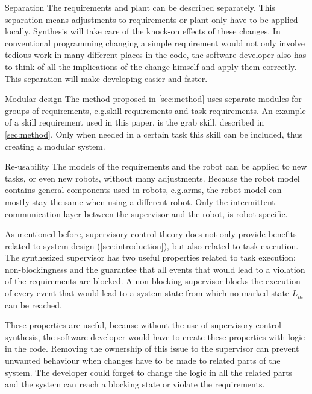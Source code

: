 \begin{LaTeXdescription}
\item[Separation] The requirements and plant can be described separately. This separation means adjustments to requirements or plant only have to be applied locally. Synthesis will take care of the knock-on effects of these changes. In conventional programming changing a simple requirement would not only involve tedious work in many different places in the code, the software developer also has to think of all the implications of the change himself and apply them correctly. This separation will make developing easier and faster.\\
\item[Modular design] The method proposed in \cref{sec:method} uses separate modules for groups of requirements, e.g.\@ skill requirements and task requirements. An example of a skill requirement used in this paper, is the grab skill, described in \cref{sec:method}. Only when needed in a certain task this skill can be included, thus creating a modular system.\\
\item[Re-usability] The models of the requirements and the robot can be applied to new tasks, or even new robots, without many adjustments. Because the robot model contains general components used in robots, e.g.\@ arms, the robot model can mostly stay the same when using a different robot. Only the intermittent communication layer between the supervisor and the robot, is robot specific.\\

\end{LaTeXdescription}

As mentioned before, supervisory control theory does not only provide benefits related to system design (\cref{sec:introduction}), but also related to task execution.
The synthesized supervisor has two useful properties related to task execution: non-blockingness and the guarantee that all events that would lead to a violation of the requirements are blocked.
A non-blocking supervisor blocks the execution of every event that would lead to a system state from which no marked state \(L_m\) can be reached.

These properties are useful, because without the use of supervisory control synthesis, the software developer would have to create these properties with logic in the code.
Removing the ownership of this issue to the supervisor can prevent unwanted behaviour when changes have to be made to related parts of the system.
The developer could forget to change the logic in all the related parts and the system can reach a blocking state or violate the requirements.\\

